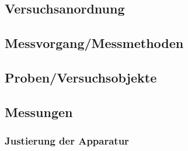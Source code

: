 \subsection{Versuchsanordnung}
\label{subsec:versuchsanordnung}


\subsection{Messvorgang/Messmethoden}
\label{subsec:messvorgang}


\subsection{Proben/Versuchsobjekte}
\label{subsec:proben}


\subsection{Messungen}
\label{subsec:messungen}


\subsubsection{Justierung der Apparatur}
\label{subsubsec:justierung}


